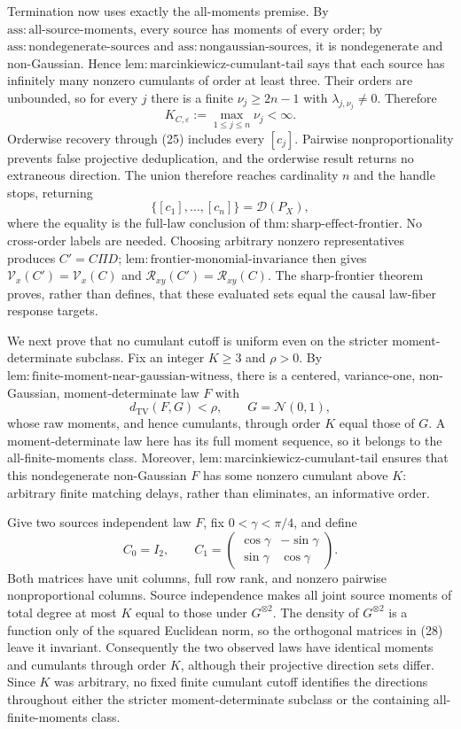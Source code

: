 Termination now uses exactly the all-moments premise. By \(\mathrm{ass:all\text{-}source\text{-}moments}\), every source has moments of every order; by \(\mathrm{ass:nondegenerate\text{-}sources}\) and \(\mathrm{ass:nongaussian\text{-}sources}\), it is nondegenerate and non-Gaussian. Hence \(\mathrm{lem:marcinkiewicz\text{-}cumulant\text{-}tail}\) says that each source has infinitely many nonzero cumulants of order at least three. Their orders are unbounded, so for every \(j\) there is a finite \(\nu_j\ge2n-1\) with \(\lambda_{j,\nu_j}\ne0\). Therefore
\[
 K_{C,\varepsilon}:=\max_{1\le j\le n}\nu_j<\infty. \tag{25}
\]
Orderwise recovery through (25) includes every \([c_j]\). Pairwise nonproportionality prevents false projective deduplication, and the orderwise result returns no extraneous direction. The union therefore reaches cardinality \(n\) and the handle stops, returning
\[
 \{[c_1],\ldots,[c_n]\}=\mathcal D(P_X), \tag{26}
\]
where the equality is the full-law conclusion of \(\mathrm{thm:sharp\text{-}effect\text{-}frontier}\). No cross-order labels are needed. Choosing arbitrary nonzero representatives produces \(C'=C\Pi D\); \(\mathrm{lem:frontier\text{-}monomial\text{-}invariance}\) then gives \(\mathcal V_x(C')=\mathcal V_x(C)\) and \(\mathcal R_{xy}(C')=\mathcal R_{xy}(C)\). The sharp-frontier theorem proves, rather than defines, that these evaluated sets equal the causal law-fiber response targets.

We next prove that no cumulant cutoff is uniform even on the stricter moment-determinate subclass. Fix an integer \(K\ge3\) and \(\rho>0\). By \(\mathrm{lem:finite\text{-}moment\text{-}near\text{-}gaussian\text{-}witness}\), there is a centered, variance-one, non-Gaussian, moment-determinate law \(F\) with
\[
 d_{\mathrm{TV}}(F,G)<\rho,
 \qquad G=\mathcal N(0,1), \tag{27}
\]
whose raw moments, and hence cumulants, through order \(K\) equal those of \(G\). A moment-determinate law here has its full moment sequence, so it belongs to the all-finite-moments class. Moreover, \(\mathrm{lem:marcinkiewicz\text{-}cumulant\text{-}tail}\) ensures that this nondegenerate non-Gaussian \(F\) has some nonzero cumulant above \(K\): arbitrary finite matching delays, rather than eliminates, an informative order.

Give two sources independent law \(F\), fix \(0<\gamma<\pi/4\), and define
\[
 C_0=I_2,
 \qquad
 C_1=
 \begin{pmatrix}
 \cos\gamma&-\sin\gamma\\
 \sin\gamma&\cos\gamma
 \end{pmatrix}. \tag{28}
\]
Both matrices have unit columns, full row rank, and nonzero pairwise nonproportional columns. Source independence makes all joint source moments of total degree at most \(K\) equal to those under \(G^{\otimes2}\). The density of \(G^{\otimes2}\) is a function only of the squared Euclidean norm, so the orthogonal matrices in (28) leave it invariant. Consequently the two observed laws have identical moments and cumulants through order \(K\), although their projective direction sets differ. Since \(K\) was arbitrary, no fixed finite cumulant cutoff identifies the directions throughout either the stricter moment-determinate subclass or the containing all-finite-moments class.

